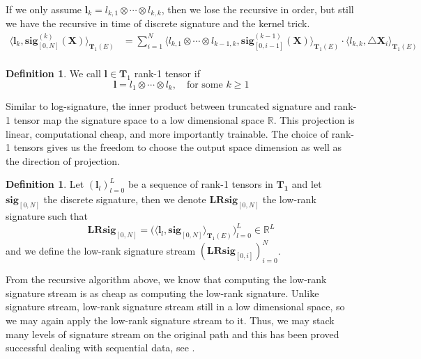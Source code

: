 \documentclass[12pt]{report}
\theoremstyle{definition}
\newtheorem{definition}[theorem]{Definition}
\theoremstyle{remark}
\newcommand{\R}{\mathbb{R}}
\begin{document}
  If we only assume $\mathbf{l}_{k} = l_{k,1} \otimes \cdots \otimes l_{k,k}$, then we lose the recursive in order, but still we have the recursive in time of discrete signature and the kernel trick.
    \begin{equation}
    \begin{split}
     \langle \mathbf{l}_{k}, \mathbf{sig}^{(k)}_{[0,N]}(\mathbf{X}) \rangle_{\mathbf{T}_{1}(E)} &= \sum_{i=1}^{N} \langle l_{k,1} \otimes \cdots \otimes l_{k-1,k} ,\mathbf{sig}^{(k-1)}_{[0,i-1]}(\mathbf{X})\rangle_{\mathbf{T}_{1}(E)}\cdot\langle l_{k,k},\triangle \mathbf{X}_{i}\rangle_{\mathbf{T}_{1}(E)} \\
    \end{split}
  \end{equation}
  
  \begin{definition}
    We call $\mathbf{l}  \in \mathbf{T}_{1}$ rank-1 tensor if
    \begin{equation}
      \mathbf{l} = l_{1} \otimes \cdots \otimes l_{k},\quad \text{for some  }k \geq 1
    \end{equation}
  \end{definition}
  Similar to log-signature, the inner product between truncated signature and rank-1 tensor map the signature space to a low dimensional space $\R$. This projection is linear, computational cheap, and more importantly trainable. The choice of rank-1 tensors gives us the freedom to choose the output space dimension as well as the direction of projection.
  \begin{definition}
    Let $(\mathbf{l}_{l})_{l=0}^{L}$ be a sequence of rank-1 tensors in $\mathbf{T_{1}}$ and let $\mathbf{sig}_{[0,N]}$ the discrete signature, then we denote $\mathbf{LRsig}_{[0,N]}$ the low-rank signature such that 
  \begin{equation}
    \mathbf{LRsig}_{[0,N]} = \big(\langle \mathbf{l}_{l} , \mathbf{sig}_{[0,N]} \rangle_{\mathbf{T}_{1}(E)}\big)_{l=0}^{L} \in \R^{L}
  \end{equation} 
  and we define the low-rank signature stream $(\mathbf{LRsig}_{[0,i]})_{i=0}^{N}$.
  \end{definition}
  From the recursive algorithm above, we know that computing the low-rank signature stream is as cheap as computing the low-rank signature. Unlike signature stream, low-rank signature stream still in a low dimensional space, so we may again apply the low-rank signature stream to it. Thus, we may stack many levels of signature stream on the original path and this has been proved successful dealing with sequential data, see \cite{toth2020seq2tens}.
\end{document}
